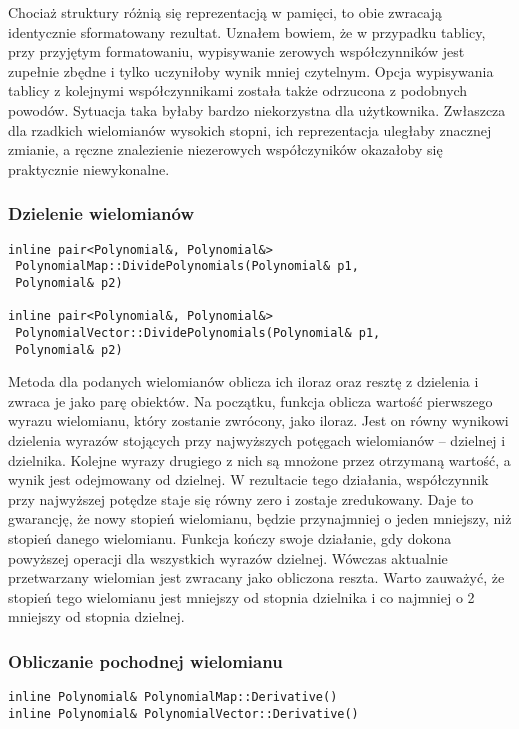 Chociaż struktury różnią się reprezentacją w pamięci, to obie zwracają identycznie sformatowany rezultat. Uznałem bowiem, że w przypadku tablicy, przy przyjętym formatowaniu, wypisywanie zerowych współczynników jest zupełnie zbędne i tylko uczyniłoby wynik mniej czytelnym. Opcja wypisywania tablicy z kolejnymi współczynnikami została także odrzucona z podobnych powodów. Sytuacja taka byłaby bardzo niekorzystna dla użytkownika. Zwłaszcza dla rzadkich wielomianów wysokich stopni, ich reprezentacja uległaby znacznej zmianie, a ręczne znalezienie niezerowych współczyników okazałoby się praktycznie niewykonalne.

\subsubsection{Dzielenie wielomianów}
\begin{lstlisting}
inline pair<Polynomial&, Polynomial&>
 PolynomialMap::DividePolynomials(Polynomial& p1,
 Polynomial& p2)

inline pair<Polynomial&, Polynomial&>
 PolynomialVector::DividePolynomials(Polynomial& p1,
 Polynomial& p2)
\end{lstlisting}

Metoda dla podanych wielomianów oblicza ich iloraz oraz resztę z dzielenia i zwraca je jako parę obiektów. Na początku, funkcja oblicza wartość pierwszego wyrazu wielomianu, który zostanie zwrócony, jako iloraz. Jest on równy wynikowi dzielenia wyrazów stojących przy najwyższych potęgach wielomianów – dzielnej i dzielnika. Kolejne wyrazy drugiego z nich są mnożone przez otrzymaną wartość, a wynik jest odejmowany od dzielnej. W rezultacie tego działania, współczynnik przy najwyższej potędze staje się równy zero i zostaje zredukowany. Daje to gwarancję, że nowy stopień wielomianu, będzie przynajmniej o jeden mniejszy, niż stopień danego wielomianu. Funkcja kończy swoje działanie, gdy dokona powyższej operacji dla wszystkich wyrazów dzielnej. Wówczas aktualnie przetwarzany wielomian jest zwracany jako obliczona reszta. Warto zauważyć, że stopień tego wielomianu jest mniejszy od stopnia dzielnika i co najmniej o 2 mniejszy od stopnia dzielnej.

\subsubsection{Obliczanie pochodnej wielomianu}
\begin{lstlisting}
inline Polynomial& PolynomialMap::Derivative()
inline Polynomial& PolynomialVector::Derivative()
\end{lstlisting}

